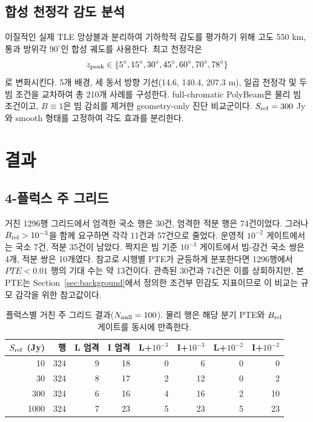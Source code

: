\documentclass[final,5p,times]{elsarticle}
\newcommand{\NMainRows}{1296}
\newcommand{\NMainLocalStrict}{30}
\newcommand{\NMainIntStrict}{74}
\newcommand{\NMainLocalPhysEthree}{11}
\newcommand{\NMainIntPhysEthree}{57}
\newcommand{\NMainLocalPhysEtwo}{7}
\newcommand{\NMainIntPhysEtwo}{35}
\newcommand{\NMainBeamRobustLocalEthree}{4}
\newcommand{\NMainBeamRobustIntEthree}{10}
\newcommand{\NMainExpectedFP}{13}
\newcommand{\NZAAll}{210}
\begin{document}
\subsection{합성 천정각 감도 분석}
\label{sec:design:za}

이질적인 실제 TLE 앙상블과 분리하여 기하학적 감도를 평가하기 위해
고도 550 km, 통과 방위각 $90^\circ$인 합성 궤도를 사용한다.
최고 천정각은
\begin{equation}
 z_{\rm peak}\in\{5^\circ,15^\circ,30^\circ,45^\circ,
 60^\circ,70^\circ,78^\circ\}
\end{equation}
로 변화시킨다. 5개 배경, 세 동서 방향 기선(14.6, 140.4, 207.3 m),
일곱 천정각 및 두 빔 조건을 교차하여 총 \NZAAll{}개 사례를
구성한다. full-chromatic PolyBeam은 물리 빔 조건이고,
$B\equiv1$은 빔 감쇠를 제거한 geometry-only 진단 비교군이다.
$S_{\rm ref}=300$ Jy와 smooth 형태를 고정하여 각도 효과를 분리한다.

\section{결과}
\label{sec:results}

\subsection{4-플럭스 주 그리드}
\label{sec:results:grid}

거친 \NMainRows{}행 그리드에서 엄격한 국소 행은
\NMainLocalStrict{}건, 엄격한 적분 행은 \NMainIntStrict{}건이었다.
그러나 $B_{\rm rel}>10^{-3}$을 함께 요구하면 각각
\NMainLocalPhysEthree{}건과 \NMainIntPhysEthree{}건으로 줄었다.
운영적 $10^{-2}$ 게이트에서는 국소 \NMainLocalPhysEtwo{}건,
적분 \NMainIntPhysEtwo{}건이 남았다. 짝지은 빔 기준
$10^{-3}$ 게이트에서 빔-강건 국소 쌍은
\NMainBeamRobustLocalEthree{}개, 적분 쌍은
\NMainBeamRobustIntEthree{}개였다. 참고로 시행별 PTE가 균등하게
분포한다면 \NMainRows{}행에서 $PTE<0.01$ 행의 기대 수는 약
\NMainExpectedFP{}건이다. 관측된 \NMainLocalStrict{}건과
\NMainIntStrict{}건은 이를 상회하지만, 본 PTE는
Section~\ref{sec:background}에서 정의한 조건부 민감도 지표이므로
이 비교는 규모 감각을 위한 참고값이다.

\begin{table}[!t]
\centering
\small
\caption{플럭스별 거친 주 그리드 결과($N_{\rm null}=100$). 물리 행은
해당 분기 PTE와 $B_{\rm rel}$ 게이트를 동시에 만족한다.}
\label{tab:flux_counts}
\begin{tabular}{rrrrrrrr}
\toprule
$S_{\rm ref}$ (Jy) & 행 & L 엄격 & I 엄격 &
L+$10^{-3}$ & I+$10^{-3}$ & L+$10^{-2}$ & I+$10^{-2}$ \\
\midrule
10   & 324 & 9 & 18 & 0 & 6  & 0 & 0 \\
30   & 324 & 8 & 17 & 2 & 12 & 0 & 2 \\
300  & 324 & 6 & 16 & 4 & 16 & 2 & 10 \\
1000 & 324 & 7 & 23 & 5 & 23 & 5 & 23 \\
\bottomrule
\end{tabular}
\end{table}
\end{document}
